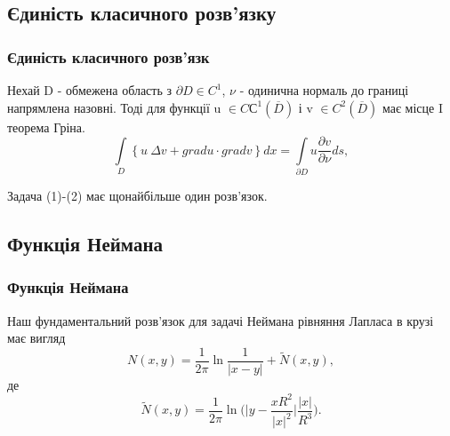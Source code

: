 \documentclass[10pt]{beamer}
\begin{document}
\subsection{Єдиність класичного розв'язку}
\begin{frame}
\frametitle{Єдиність класичного розв'язк}
\begin{theorem}
Нехай D - обмежена область з $\partial{D} \in C^1$, $\nu$ - одинична нормаль до границі напрямлена назовні. Тоді для функції u $\in  CС^1(\overline{D})$ і v $\in C^2(\overline D)$ має місце I теорема Гріна.
\begin{equation*}
\int\limits_{D}\left\{u \ \Delta v+gradu\cdot gradv\right\}dx=\int\limits_{\partial D}u\frac{\partial v}{\partial\nu}ds,
\end{equation*}
\end{theorem}
\begin{theorem}
Задача (1)-(2) має щонайбільше один розв'язок.
\end{theorem}
\end{frame}



\subsection{Функція Неймана}
\begin{frame}
\frametitle{Функція Неймана}
Наш фундаментальний розв'язок для задачі Неймана рівняння Лапласа в крузі має вигляд
\begin{equation}\label{7}
N(x,y) = \frac{1}{2\pi} \ln{\frac{1}{|x-y|}} + \tilde{N}(x,y),
\end{equation}
де
\begin{equation}\label{8}
\tilde{N}(x,y) = \frac{1}{2\pi}\ln{\bigg(\bigg|y-\frac{xR^2}{|x|^2}\bigg|\frac{|x|}{R^3}\bigg)}.
\end{equation}
\end{frame}
\end{document}
